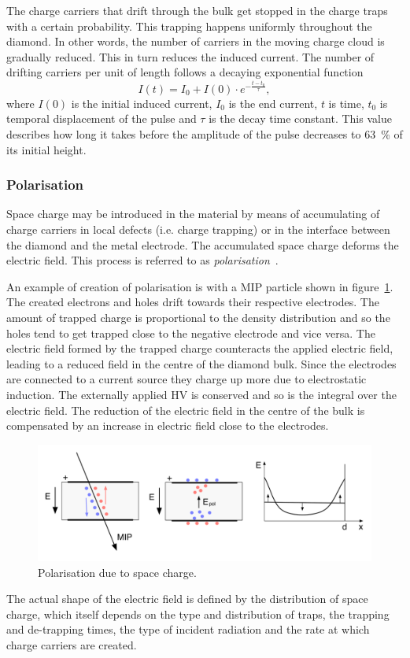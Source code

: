 The charge carriers that drift through the bulk get stopped in the charge traps with a certain probability. This trapping happens uniformly throughout the diamond. In other words, the number of carriers in the moving charge cloud is gradually reduced. This in turn reduces the induced current. The number of drifting carriers per unit of length follows a decaying exponential function
\begin{equation}
\label{eq:decayexp}
I(t)= I_0 + I(0) \cdot e^{-\frac{t-t_0}{\tau} },
\end{equation}
where $I(0)$ is the initial induced current, $I_0$ is the end current, $t$ is time, $t_0$ is temporal displacement of the pulse and $\tau$ is the decay time constant. This value describes how long it takes before the amplitude of the pulse decreases to 63~\% of its initial height.

\subsubsection{Polarisation}
Space charge may be introduced in the material by means of accumulating of charge carriers in local defects (i.e. charge trapping) or in the interface between the diamond and the metal electrode. The accumulated space charge deforms the electric field. This process is referred to as \emph{polarisation}~\cite{Guthoff:1977429}. 

An example of creation of polarisation is with a MIP particle shown in figure~\ref{fig:polar1}. The created electrons and holes drift towards their respective electrodes. The amount of trapped charge is proportional to the density distribution and so the holes tend to get trapped close to the negative electrode and vice versa. The electric field formed by the trapped charge counteracts the applied electric field, leading to a reduced field in the centre of the diamond bulk. Since the electrodes are connected to a current source they charge up more due to electrostatic induction. The externally applied HV is conserved and so is the integral over the electric field. The reduction of the electric field in the centre of the bulk is compensated by an increase in electric field close to the electrodes. 
\begin{figure}[!t]
\begin{center}
\includegraphics[width=0.9\linewidth]{02_pulse_formation/pics/plots/polar1}
\caption{Polarisation due to space charge.}
\label{fig:polar1}
\end{center}
\end{figure}
The actual shape of the electric field is defined by the distribution of space charge, which itself depends on the type and distribution of traps, the trapping and de-trapping times, the type of incident radiation and the rate at which charge carriers are created.

